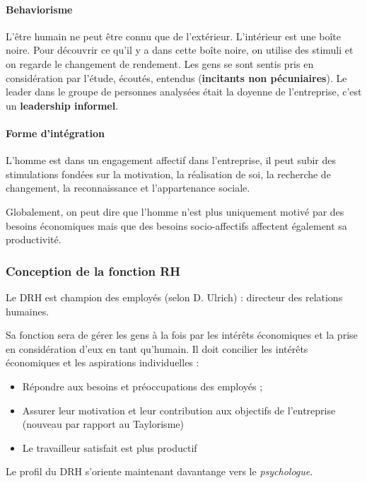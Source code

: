 \documentclass[12pt]{article}
\begin{document}
	  
	  \paragraph{Behaviorisme} L'être humain ne peut être connu que de l'extérieur. L'intérieur est une \og{} boîte noire\fg{}. Pour découvrir ce qu'il y a dans cette boîte noire, on utilise des stimuli et on regarde le changement de rendement. Les gens se sont sentis pris en considération par l'étude, écoutés, entendus (\textbf{incitants non pécuniaires}). Le leader dans le groupe de personnes analysées était la doyenne de l'entreprise, c'est un \textbf{leadership informel}.
	  
	  \paragraph{Forme d'intégration} L'homme est dans un engagement affectif dans l'entreprise, il peut subir des stimulations fondées sur la motivation, la réalisation de soi, la recherche de changement, la reconnaissance et l'appartenance sociale.
	  
	  Globalement, on peut dire que l'homme n'est plus uniquement motivé par des besoins économiques mais que des besoins socio-affectifs affectent également sa productivité.
	  
	  \subsubsection{Conception de la fonction RH}
	  
	  Le DRH est \og{} champion des employés\fg{} (selon D. Ulrich) : directeur des relations humaines.
	  
	  Sa fonction sera de gérer les gens à la fois par les intérêts économiques et la prise en considération d'eux en tant qu'humain. Il doit concilier les intérêts économiques et les aspirations individuelles :
	  
	  \begin{itemize}
	   \item Répondre aux besoins et préoccupations des employés ;
	   \item Assurer leur motivation et leur contribution aux objectifs de l'entreprise (nouveau par rapport au Taylorisme)
	   \item Le travailleur satisfait est plus productif
	  \end{itemize}
	  
	  Le profil du DRH s'oriente maintenant davantange vers le \emph{psychologue}.
	  
\end{document}
